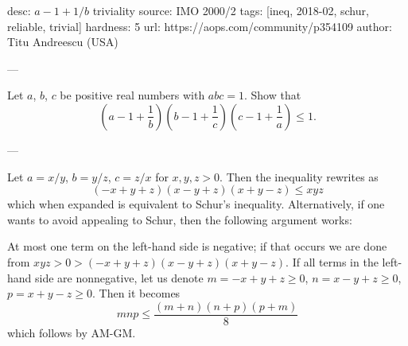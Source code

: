 desc: $a-1+1/b$ triviality
source: IMO 2000/2
tags: [ineq, 2018-02, schur, reliable, trivial]
hardness: 5
url: https://aops.com/community/p354109
author: Titu Andreescu (USA)

---

Let $a$, $b$, $c$ be positive real numbers with $abc = 1$.
Show that
\[
  \left( a - 1 + \frac 1b \right)
  \left( b - 1 + \frac 1c \right)
  \left( c - 1 + \frac 1a \right)
  \le 1.
\]

---

Let $a = x/y$, $b = y/z$, $c = z/x$ for $x,y,z > 0$.
Then the inequality rewrites as
\[ (-x+y+z)(x-y+z)(x+y-z) \le xyz \]
which when expanded is equivalent to Schur's inequality.
Alternatively, if one wants to avoid appealing to Schur,
then the following argument works:
\begin{itemize}
  \ii At most one term on the left-hand side is negative;
  if that occurs we are done from $xyz > 0 > (-x+y+z)(x-y+z)(x+y-z)$.
  \ii If all terms in the left-hand side are nonnegative,
  let us denote $m = -x+y+z \ge 0$, $n = x-y+z \ge 0$, $p = x+y-z \ge 0$.
  Then it becomes
  \[ mnp \le \frac{(m+n)(n+p)(p+m)}{8} \]
  which follows by AM-GM.
\end{itemize}
